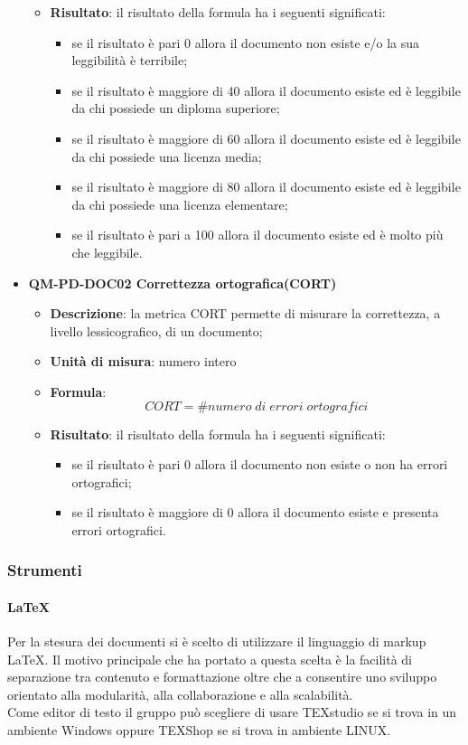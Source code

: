 \begin{itemize}
\begin{itemize}
							\item\textbf{Risultato}: il risultato della formula ha i seguenti significati:
								\begin{itemize}
									\item se il risultato è pari 0 allora il documento non esiste e/o la sua leggibilità è terribile;
									\item se il risultato è maggiore di 40 allora il documento esiste ed è leggibile da chi possiede un diploma superiore;
									\item se il risultato è maggiore di 60 allora il documento esiste ed è leggibile da chi possiede una licenza media;
									\item se il risultato è maggiore di 80 allora il documento esiste ed è leggibile da chi possiede una licenza elementare;
									\item se il risultato è pari a 100 allora il documento esiste ed è molto più che leggibile.
								\end{itemize}
						\end{itemize}
					\item\textbf{QM-PD-DOC02 Correttezza ortografica(CORT)} 
						\begin{itemize}
							\item\textbf{Descrizione}: la metrica CORT permette di misurare la correttezza, a livello lessicografico, di un documento;
							\item\textbf{Unità di misura}: numero intero
							\item\textbf{Formula}: \\
								\[CORT = \# \mathit{numero\;di\;errori\;ortografici}\]
							\item\textbf{Risultato}: il risultato della formula ha i seguenti significati:
								\begin{itemize}
									\item se il risultato è pari 0 allora il documento non esiste o non ha errori ortografici;
									\item se il risultato è maggiore di 0 allora il documento esiste e presenta errori ortografici.
								\end{itemize}
						\end{itemize}
				\end{itemize}
		\subsubsection{Strumenti}
			\paragraph{LaTeX}
				Per la stesura dei documenti si è scelto di utilizzare il linguaggio di markup LaTeX. Il motivo principale che ha portato a questa scelta è la facilità di separazione tra contenuto e formattazione oltre che a consentire uno sviluppo orientato alla modularità, alla collaborazione e alla scalabilità.\\
				Come editor di testo il gruppo può scegliere di usare TEXstudio se si trova in un ambiente Windows oppure TEXShop se si trova in ambiente LINUX.  \\
